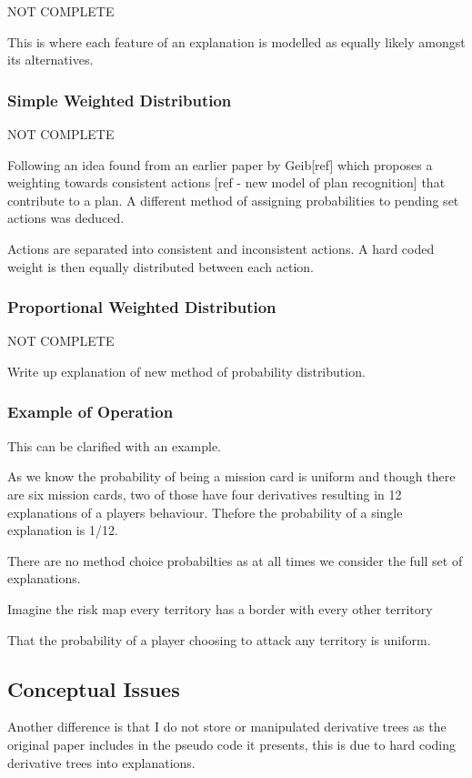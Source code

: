 \documentclass[parskip]{cs4rep}
\begin{document}
NOT COMPLETE

This is where each feature of an explanation is modelled as equally likely amongst its alternatives. 

\subsubsection{Simple Weighted Distribution}

NOT COMPLETE

Following an idea found from an earlier paper by Geib[ref] which proposes a weighting towards consistent actions [ref - new model of plan recognition] that contribute to a plan. A different method of assigning probabilities to pending set actions was deduced.

Actions are separated into consistent and inconsistent actions. A hard coded weight is then equally distributed between each action.

\subsubsection{Proportional Weighted Distribution}

NOT COMPLETE

Write up explanation of new method of probability distribution.

\subsubsection{Example of Operation}

This can be clarified with an example.

As we know the probability of being a mission card is uniform and though there are six mission cards, two of those have four derivatives resulting in 12 explanations of a players behaviour. Thefore the probability of a single explanation is 1/12.

There are no method choice probabilties as at all times we consider the full set of explanations.

Imagine the risk map every territory has a border with every other territory

That the probability of a player choosing to attack any territory is uniform.

\subsection{Conceptual Issues}

Another difference is that I do not store or manipulated derivative trees as the original paper includes in the pseudo code it presents, this is due to hard coding derivative trees into explanations.
\end{document}
